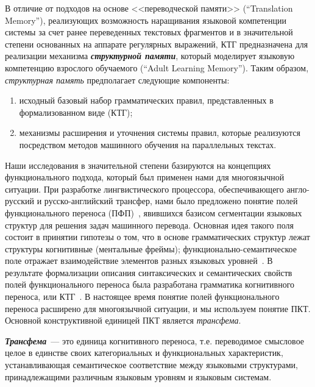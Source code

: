 \begin{multicols}{2}
В отличие от подходов на основе <<переводческой памяти>> (``Translation
Memory''), реа\-ли\-зу\-ющих возможность наращивания языковой компетенции
сис\-те\-мы за счет ранее переведенных текстовых фрагментов и в значительной
степени основанных на аппарате регулярных выражений, КТГ предназначена для 
реализации механизма {\bfseries\textit{структурной памяти}},  который 
моделирует языковую компетенцию взрослого обучаемого (``Adult Learning 
Memory''). Таким образом, \textit{структурная память} предполагает следующие 
компоненты:
\begin{enumerate}[(1)]
\item исходный базовый набор грамматических правил, представленных в
формализованном виде (КТГ);
\item механизмы расширения и уточнения системы правил, которые
реализуются посредством методов машинного обучения на параллельных
текстах.
\end{enumerate}

Наши исследования в значительной степени базируются на концепциях
функционального подхода, который был применен нами для многоязычной ситуации. 
При разработке лингвистического процессора, обеспечивающего англо-русский и 
русско-английский трансфер, нами было предложено понятие полей функционального 
переноса (ПФП)~\cite{11koz, 12koz}, явившихся базисом сегментации языковых 
структур для решения задач машинного перевода. Основная идея такого поля 
состоит в принятии гипотезы о том, что в основе грамматических структур лежат 
структуры когнитивные (ментальные фреймы); функционально-семантическое поле 
отражает взаимодействие элементов разных языковых уровней~\cite{12koz}. В 
результате формализации описания синтаксических и семантических свойств полей 
функционального переноса была разработана грамматика когнитивного переноса, или 
КТГ~\cite{11koz}. В настоящее время понятие  полей функционального переноса 
расширено для многоязычной ситуации, и мы используем понятие ПКТ. Основной 
конструктивной единицей ПКТ является \textit{трансфема}. 
{

}

{\bfseries\textit{Трансфема}}~--- {\sf это единица когнитивного пе\-рено\-са, 
т.е. переводимое смысловое целое в единстве своих категориальных и 
функциональных характеристик, устанавливающая семантическое соответствие между 
языковыми структурами, принадлежащими различным языковым уровням и языковым 
сис\-те\-мам.}


\end{multicols}
